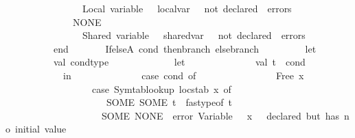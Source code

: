 \begin{isabellebody}
\ \ \ \ \ \ \ \ \ \ \ \ \ \ \ \ {\isacharparenleft}{\kern0pt}{\isachardoublequote}{\kern0pt}Local\ variable\ {\isachardoublequote}{\kern0pt}\ {\isacharcircum}{\kern0pt}\ local{\isacharunderscore}{\kern0pt}var\ {\isacharcircum}{\kern0pt}\ {\isachardoublequote}{\kern0pt}\ not\ declared{\isachardoublequote}{\kern0pt}{\isacharparenright}{\kern0pt}\ {\isacharcolon}{\kern0pt}{\isacharcolon}{\kern0pt}\ errors\isanewline
\ \ \ \ \ \ \ \ \ \ \ \ {\isacharbar}{\kern0pt}\ {\isacharparenleft}{\kern0pt}{\isacharunderscore}{\kern0pt}{\isacharcomma}{\kern0pt}\ NONE{\isacharparenright}{\kern0pt}\ {\isacharequal}{\kern0pt}{\isachargreater}{\kern0pt}\isanewline
\ \ \ \ \ \ \ \ \ \ \ \ \ \ \ \ {\isacharparenleft}{\kern0pt}{\isachardoublequote}{\kern0pt}Shared\ variable\ {\isachardoublequote}{\kern0pt}\ {\isacharcircum}{\kern0pt}\ shared{\isacharunderscore}{\kern0pt}var\ {\isacharcircum}{\kern0pt}\ {\isachardoublequote}{\kern0pt}\ not\ declared{\isachardoublequote}{\kern0pt}{\isacharparenright}{\kern0pt}\ {\isacharcolon}{\kern0pt}{\isacharcolon}{\kern0pt}\ errors\isanewline
\ \ \ \ \ \ \ \ \ \ end\isanewline
\ \ \ \ \ \ {\isacharbar}{\kern0pt}\ IfelseA\ {\isacharparenleft}{\kern0pt}{\isacharparenleft}{\kern0pt}cond{\isacharcomma}{\kern0pt}\ then{\isacharunderscore}{\kern0pt}branch{\isacharparenright}{\kern0pt}{\isacharcomma}{\kern0pt}\ else{\isacharunderscore}{\kern0pt}branch{\isacharparenright}{\kern0pt}\ {\isacharequal}{\kern0pt}{\isachargreater}{\kern0pt}\isanewline
\ \ \ \ \ \ \ \ let\isanewline
\ \ \ \ \ \ \ \ \ \ val\ cond{\isacharunderscore}{\kern0pt}type\ {\isacharequal}{\kern0pt}\isanewline
\ \ \ \ \ \ \ \ \ \ \ \ let\isanewline
\ \ \ \ \ \ \ \ \ \ \ \ \ \ val\ t\ {\isacharequal}{\kern0pt}\ cond\isanewline
\ \ \ \ \ \ \ \ \ \ \ \ in\isanewline
\ \ \ \ \ \ \ \ \ \ \ \ \ \ case\ cond\ of\isanewline
\ \ \ \ \ \ \ \ \ \ \ \ \ \ \ \ Free\ {\isacharparenleft}{\kern0pt}x{\isacharcomma}{\kern0pt}\ {\isacharunderscore}{\kern0pt}{\isacharparenright}{\kern0pt}\ {\isacharequal}{\kern0pt}{\isachargreater}{\kern0pt}\isanewline
\ \ \ \ \ \ \ \ \ \ \ \ \ \ \ \ \ \ {\isacharparenleft}{\kern0pt}case\ Symtab{\isachardot}{\kern0pt}lookup\ locstab\ x\ of\isanewline
\ \ \ \ \ \ \ \ \ \ \ \ \ \ \ \ \ \ \ \ \ SOME\ {\isacharparenleft}{\kern0pt}SOME\ t{\isacharprime}{\kern0pt}{\isacharparenright}{\kern0pt}\ {\isacharequal}{\kern0pt}{\isachargreater}{\kern0pt}\ fastype{\isacharunderscore}{\kern0pt}of\ t{\isacharprime}{\kern0pt}\isanewline
\ \ \ \ \ \ \ \ \ \ \ \ \ \ \ \ \ \ \ {\isacharbar}{\kern0pt}\ SOME\ NONE\ {\isacharequal}{\kern0pt}{\isachargreater}{\kern0pt}\ error\ {\isacharparenleft}{\kern0pt}{\isachardoublequote}{\kern0pt}Variable\ {\isachardoublequote}{\kern0pt}\ {\isacharcircum}{\kern0pt}\ x\ {\isacharcircum}{\kern0pt}\ {\isachardoublequote}{\kern0pt}\ declared\ but\ has\ no\ initial\ value{\isachardoublequote}{\kern0pt}{\isacharparenright}{\kern0pt}\isanewline

\end{isabellebody}
